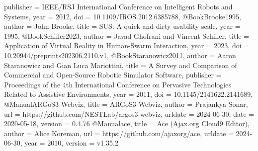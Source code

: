 \documentclass[german,version-2020-11]{uzl-thesis}
\begin{document}
\begin{bibtex-entries}
{  publisher =    {IEEE/RSJ International Conference on Intelligent Robots and Systems},
  year =         {2012},
  doi =          {10.1109/IROS.2012.6385788},
}
@Book{Brooke1995,
  author =       {John Brooke},
  title =        {SUS: A quick and dirty usability scale},
  year =         {1995},
}
@Book{Schiller2023,
  author =       {Javad Ghofrani and Vincent Schiller},
  title =        {Application of Virtual Reality in Human-Swarm Interaction},
  year =         {2023},
  doi =          {10.20944/preprints202306.2110.v1},
}
@Book{Staranowicz2011,
  author =       {Aaron Staranowicz and Gian Luca Mariottini},
  title =        {A Survey and Comparison of Commercial and Open-Source Robotic Simulator Software},
  publisher =    {Proceedings of the 4th International Conference on Pervasive Technologies Related to Assistive Environments},
  year =         {2011},
  doi =          {10.1145/2141622.2141689},
}
@Manual{ARGoS3-Webviz,
  title =        {ARGoS3-Webviz},
  author =       {Prajankya Sonar},
  url =          {https://github.com/NESTLab/argos3-webviz},
  urldate =      {2024-06-30},
  date =         {2020-05-18},
  version =      {0.4.76}
}
@Manual{ace,
  title =        {Ace (Ajax.org Cloud9 Editor)},
  author =       {Alice Koreman},
  url =          {https://github.com/ajaxorg/ace},
  urldate =      {2024-06-30},
  year =         {2010},
  version =      {v1.35.2}
}

\end{bibtex-entries}



%
%
%
%
\end{document}
